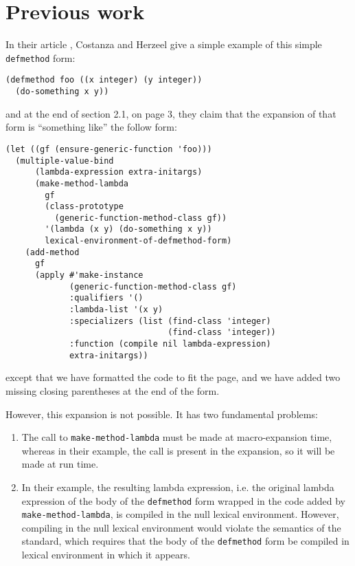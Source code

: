 \section{Previous work}

In their article \cite{Constanza:2008}, Costanza and Herzeel give a
simple example of this simple \texttt{defmethod} form:

\begin{verbatim}
(defmethod foo ((x integer) (y integer))
  (do-something x y))
\end{verbatim}

\noindent
and at the end of section 2.1, on page 3, they claim that the
expansion of that form is ``something like'' the follow form:

{\small\begin{verbatim}
(let ((gf (ensure-generic-function 'foo)))
  (multiple-value-bind
      (lambda-expression extra-initargs)
      (make-method-lambda
        gf
        (class-prototype
          (generic-function-method-class gf))
        '(lambda (x y) (do-something x y))
        lexical-environment-of-defmethod-form)
    (add-method
      gf
      (apply #'make-instance
             (generic-function-method-class gf)
             :qualifiers '()
             :lambda-list '(x y)
             :specializers (list (find-class 'integer)
                                 (find-class 'integer))
             :function (compile nil lambda-expression)
             extra-initargs))
\end{verbatim}}

\noindent
except that we have formatted the code to fit the page, and we have
added two missing closing parentheses at the end of the form.

However, this expansion is not possible.  It has two fundamental
problems:

\begin{enumerate}
\item The call to \texttt{make-method-lambda} must be made at
  macro-expansion time, whereas in their example, the call is present
  in the expansion, so it will be made at run time.
\item In their example, the resulting lambda expression, i.e. the
  original lambda expression of the body of the \texttt{defmethod}
  form wrapped in the code added by \texttt{make-method-lambda}, is
  compiled in the null lexical environment.  However, compiling in the
  null lexical environment would violate the semantics of the
  \commonlisp{} standard, which requires that the body of the
  \texttt{defmethod} form be compiled in lexical environment in which
  it appears.
\end{enumerate}
